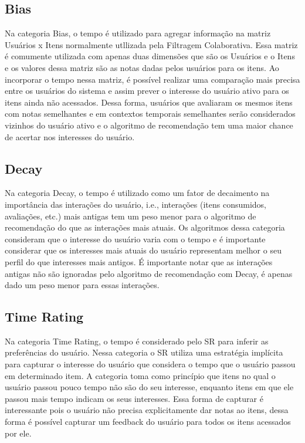 \subsection{Bias}

Na categoria Bias, o tempo é utilizado para agregar informação na matriz Usuários x Itens normalmente utllizada pela Filtragem Colaborativa. Essa matriz é comumente utilizada com apenas duas dimensões que são os Usuários e o Itens e os valores dessa matriz são as notas dadas pelos usuários para os itens. Ao incorporar o tempo nessa matriz, é possível realizar uma comparação mais precisa entre os usuários do sistema e assim prever o interesse do usuário ativo para os itens ainda não acessados. Dessa forma, usuários que avaliaram os mesmos itens com notas semelhantes e em contextos temporais semelhantes serão considerados vizinhos do usuário ativo e o algoritmo de recomendação tem uma maior chance de acertar nos interesses do usuário.

\subsection{Decay}

Na categoria Decay, o tempo é utilizado como um fator de decaimento na importância das interações do usuário, i.e., interações (itens consumidos, avaliações, etc.) mais antigas tem um peso menor para o algoritmo de recomendação do que as interações mais atuais. Os algoritmos dessa categoria consideram que o interesse do usuário varia com o tempo e é importante considerar que os interesses mais atuais do usuário representam melhor o seu perfil do que interesses mais antigos. É importante notar que as interações antigas não são ignoradas pelo algoritmo de recomendação com Decay, é apenas dado um peso menor para essas interações.

\subsection{Time Rating}

Na categoria Time Rating, o tempo é considerado pelo SR para inferir as preferências do usuário. Nessa categoria o SR utiliza uma estratégia implícita para capturar o interesse do usuário que considera o tempo que o usuário passou em determinado item. A categoria toma como princípio que itens no qual o usuário passou pouco tempo não são do seu interesse, enquanto itens em que ele passou mais tempo indicam os seus interesses. Essa forma de capturar é interessante pois o usuário não precisa explicitamente dar notas ao itens, dessa forma é possível capturar um feedback do usuário para todos os itens acessados por ele.

